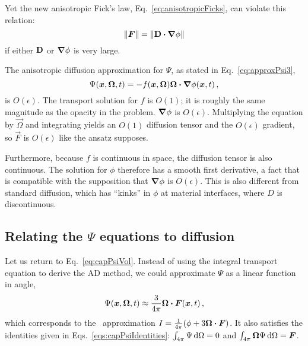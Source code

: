 Yet the new anisotropic Fick's law, Eq.~\eqref{eq:anisotropicFicks}, can violate
this relation:
\begin{equation*}
  \left\| \bm{F} \right\| = \left\| \mathbf{D} \bm{\cdot} \bm{\nabla} \phi \right\|
\end{equation*}
if either $\mathbf{D}$ or $\bm{\nabla} \phi$ is very large.

The anisotropic diffusion approximation for $\Psi$, as stated in
Eq.~\eqref{eq:approxPsi3},
\begin{equation*}
\Psi(\bm{x}, \bm{\Omega}, t) = - f(\bm{x}, \bm{\Omega})
\bm{\Omega}\bm{\cdot} \bm{\nabla} \phi(\bm{x}, t)\,,
\end{equation*}
is $O(\epsilon)$. The transport solution for $f$ is $O(1)$; it is roughly the
same magnitude as the opacity in the problem. $\bm{\nabla} \phi$ is $O(\epsilon)$.
Multiplying the equation by $\vec{\Omega}$ and integrating yields an $O(1)$
diffusion tensor and the $O(\epsilon)$ gradient, so $\vec{F}$ is $O(\epsilon)$
like the ansatz supposes.

Furthermore, because $f$ is continuous in space, the diffusion tensor is also
continuous. The solution for $\phi$ therefore has a smooth first
derivative, a fact that is compatible with the supposition that $\bm{\nabla} \phi$
is $O(\epsilon)$. This is also different from standard diffusion, which has
``kinks'' in $\phi$ at material interfaces, where $D$ is discontinuous.

\subsection{Relating the $\Psi$ equations to diffusion}\label{sec:adDiscDiff}
Let us return to Eq.~\eqref{eq:capPsiVol}. Instead of using the integral
transport equation to derive the AD method, we could approximate $\Psi$
as a linear function in angle,
\begin{equation*}
  \Psi(\bm{x}, \bm{\Omega}, t) \approx \frac{3}{4\pi} \bm{\Omega} \bm{\cdot}
  \bm{F}(\bm{x}, t)\,,
\end{equation*}
which corresponds to the \Pone\ approximation $I= \frac{1}{4\pi} (\phi +
3\bm{\Omega} \bm{\cdot} \bm{F})$. It also satisfies the identities given in
Eqs.~\eqref{eqs:capPsiIdentities}: $\int_{4\pi} \Psi \mathop{}\!\mathrm{d}\Omega = 0$ and
$\int_{4\pi} \bm{\Omega} \Psi \mathop{}\!\mathrm{d}\Omega = \bm{F}$.

